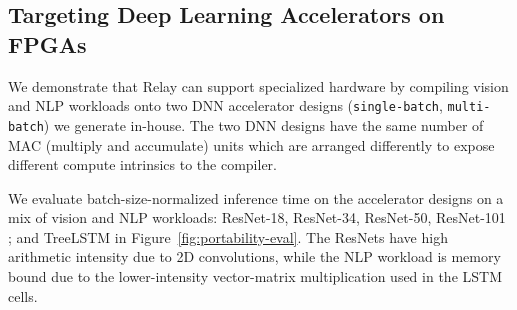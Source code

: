 \subsection*{Targeting Deep Learning Accelerators on FPGAs}
We demonstrate that Relay can support specialized hardware by compiling vision and
NLP workloads onto two DNN accelerator designs (\texttt{single-batch}, \texttt{multi-batch}) we generate in-house.
%
%
%
The two DNN designs have the same number of MAC (multiply and accumulate) units which are
arranged differently to expose different compute intrinsics to the compiler.
%
%

We evaluate batch-size-normalized inference time on the accelerator designs
  on a mix of vision and NLP workloads:
  ResNet-18, ResNet-34, ResNet-50, ResNet-101 \citep{resnet};
  and TreeLSTM in Figure~\ref{fig:portability-eval}.
The ResNets have high arithmetic intensity
due to 2D convolutions, while the NLP workload is memory bound due to the lower-intensity vector-matrix
multiplication used in the LSTM cells.

